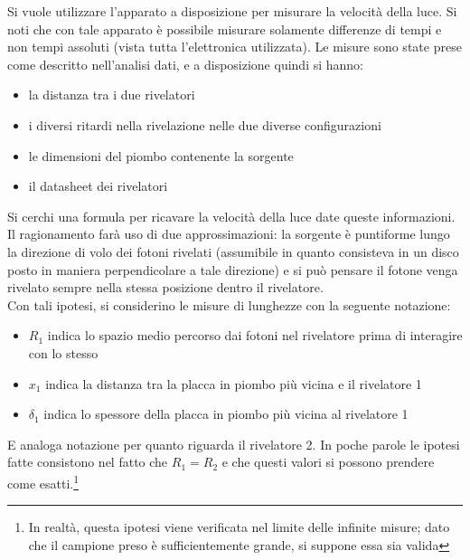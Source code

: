 Si vuole utilizzare l'apparato a disposizione per misurare la velocità della luce. Si noti che con tale apparato è possibile misurare solamente differenze di tempi
e non tempi assoluti (vista tutta l'elettronica utilizzata). Le misure sono state prese come descritto nell'analisi dati, e a disposizione quindi si hanno:
\begin{itemize}
\item la distanza tra i due rivelatori
\item i diversi ritardi nella rivelazione nelle due diverse configurazioni
\item le dimensioni del piombo contenente la sorgente
\item il datasheet dei rivelatori
\end{itemize}
Si cerchi una formula per ricavare la velocità della luce date queste informazioni. Il ragionamento farà uso di due approssimazioni: la sorgente è puntiforme lungo la direzione
di volo dei fotoni rivelati (assumibile in quanto consisteva in un disco posto in maniera perpendicolare a tale direzione)
e si può pensare il fotone venga rivelato sempre nella stessa posizione dentro il rivelatore.\\

Con tali ipotesi, si considerino le misure di lunghezze con la seguente notazione:
\begin{itemize}
\item $R_1$ indica lo spazio medio percorso dai fotoni nel rivelatore prima di interagire con lo stesso
\item $x_1$ indica la distanza tra la placca in piombo più vicina e il rivelatore 1
\item $\delta_1$ indica lo spessore della placca in piombo più vicina al rivelatore 1
\end{itemize}
E analoga notazione per quanto riguarda il rivelatore 2. In poche parole le ipotesi fatte consistono nel fatto che $R_1=R_2$ e che questi valori si possono prendere
come esatti.\footnote{In realtà, questa ipotesi viene verificata nel limite delle infinite misure; dato che il campione preso è sufficientemente grande, si suppone essa sia
valida}\\

